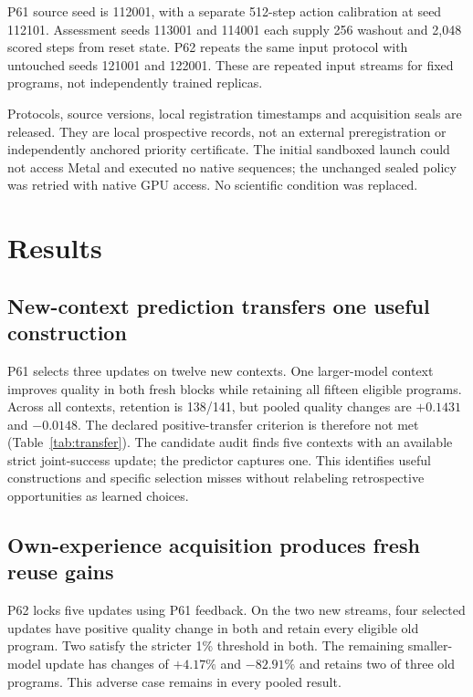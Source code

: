 \documentclass[11pt]{article}
\begin{document}
P61 source seed is 112001, with a separate 512-step action calibration at seed 112101. Assessment seeds 113001 and 114001 each supply 256 washout and 2,048 scored steps from reset state. P62 repeats the same input protocol with untouched seeds 121001 and 122001. These are repeated input streams for fixed programs, not independently trained replicas.

Protocols, source versions, local registration timestamps and acquisition seals are released. They are local prospective records, not an external preregistration or independently anchored priority certificate. The initial sandboxed launch could not access Metal and executed no native sequences; the unchanged sealed policy was retried with native GPU access. No scientific condition was replaced.

\section{Results}
\subsection{New-context prediction transfers one useful construction}
P61 selects three updates on twelve new contexts. One larger-model context improves quality in both fresh blocks while retaining all fifteen eligible programs. Across all contexts, retention is 138/141, but pooled quality changes are $+0.1431$ and $-0.0148$. The declared positive-transfer criterion is therefore not met (Table~\ref{tab:transfer}). The candidate audit finds five contexts with an available strict joint-success update; the predictor captures one. This identifies useful constructions and specific selection misses without relabeling retrospective opportunities as learned choices.

\begin{table}[ht]\centering\small
\caption{P61 frozen predictor on new runtime geometry. Changes include baseline fallbacks.}\label{tab:transfer}
\end{table}

\subsection{Own-experience acquisition produces fresh reuse gains}
P62 locks five updates using P61 feedback. On the two new streams, four selected updates have positive quality change in both and retain every eligible old program. Two satisfy the stricter 1\% threshold in both. The remaining smaller-model update has changes of $+4.17\%$ and $-82.91\%$ and retains two of three old programs. This adverse case remains in every pooled result.
\end{document}

